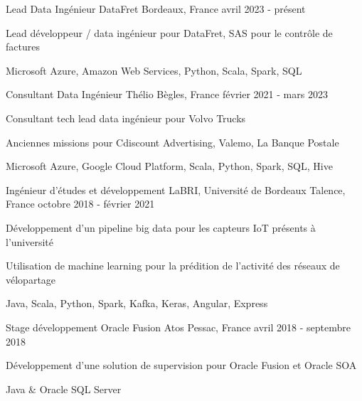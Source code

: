 
\begin{cventries}
	\cventry
	{Lead Data Ingénieur}
	{DataFret}
	{Bordeaux, France}
	{avril 2023 - présent}
	{
		\begin{cvitems}
			\item {Lead développeur / data ingénieur pour DataFret, SAS pour le contrôle de factures}
			\item {Microsoft Azure, Amazon Web Services, Python, Scala, Spark, SQL}
		\end{cvitems}
	}
	
	\cventry
	{Consultant Data Ingénieur}
	{Thélio}
	{Bègles, France}
	{février 2021 - mars 2023}
	{
		\begin{cvitems}
			\item {Consultant tech lead data ingénieur pour Volvo Trucks}
			\item {Anciennes missions pour Cdiscount Advertising, Valemo, La Banque Postale}
			\item {Microsoft Azure, Google Cloud Platform, Scala, Python, Spark, SQL, Hive}
		\end{cvitems}
	}
	
	\cventry
	{Ingénieur d'études et développement}
	{LaBRI, Université de Bordeaux}
	{Talence, France}
	{octobre 2018 - février 2021}
	{
		\begin{cvitems}
			\item {Développement d'un pipeline big data pour les capteurs IoT présents à l'université}
			\item {Utilisation de machine learning pour la prédition de l'activité des réseaux de vélopartage}
			\item {Java, Scala, Python, Spark, Kafka, Keras, Angular, Express}
		\end{cvitems}
	}
	
	\cventry
	{Stage développement Oracle Fusion}
	{Atos}
	{Pessac, France}
	{avril 2018 - septembre 2018}
	{
		\begin{cvitems}
			\item {Développement d'une solution de supervision pour Oracle Fusion et Oracle SOA}
			\item {Java \& Oracle SQL Server}
		\end{cvitems}
	}
	
\end{cventries}